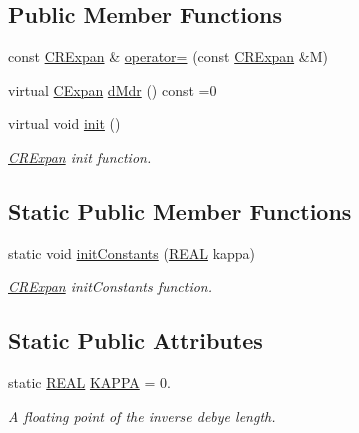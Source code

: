 \subsection*{Public Member Functions}
\begin{DoxyCompactItemize}
\item 
const \hyperlink{classCRExpan}{C\-R\-Expan} \& \hyperlink{classCRExpan_a9afa22e894d350c76064f3140f5da568}{operator=} (const \hyperlink{classCRExpan}{C\-R\-Expan} \&M)
\item 
virtual \hyperlink{classCExpan}{C\-Expan} \hyperlink{classCRExpan_aa466d783488ad5f9411f4433d74f1cb6}{d\-Mdr} () const =0
\item 
virtual void \hyperlink{classCRExpan_a348f2b26d17940dce9f8d607096a0d0f}{init} ()
\begin{DoxyCompactList}\small\item\em \hyperlink{classCRExpan}{C\-R\-Expan} init function. \end{DoxyCompactList}\end{DoxyCompactItemize}
\subsection*{Static Public Member Functions}
\begin{DoxyCompactItemize}
\item 
static void \hyperlink{classCRExpan_abd512b8848655ec2c6abcc945acbd33c}{init\-Constants} (\hyperlink{util_8h_a5821460e95a0800cf9f24c38915cbbde}{R\-E\-A\-L} kappa)
\begin{DoxyCompactList}\small\item\em \hyperlink{classCRExpan}{C\-R\-Expan} init\-Constants function. \end{DoxyCompactList}\end{DoxyCompactItemize}
\subsection*{Static Public Attributes}
\begin{DoxyCompactItemize}
\item 
static \hyperlink{util_8h_a5821460e95a0800cf9f24c38915cbbde}{R\-E\-A\-L} \hyperlink{classCRExpan_a953d378c552af1956038577788ffcd2e}{K\-A\-P\-P\-A} = 0.
\begin{DoxyCompactList}\small\item\em A floating point of the inverse debye length. \end{DoxyCompactList}\end{DoxyCompactItemize}
